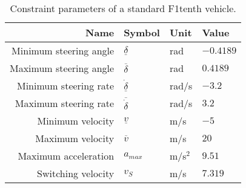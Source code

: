 \begin{table}[htb!]
\centering
\small
\begin{tabular}{rlll} 
    \hline
    \textbf{Name} & \textbf{Symbol} & \textbf{Unit} & \textbf{Value}\\ 
    \hline
    Minimum steering angle & $\underline{\delta}$ & rad & $-0.4189$ \\
    Maximum steering angle & $\overline{\delta}$ & rad & $0.4189$ \\
    Minimum steering rate & $\underline{\dot{\delta}}$ & rad/s & $-3.2$ \\
    Maximum steering rate & $\overline{\dot{\delta}}$ & rad/s & $3.2$ \\
    Minimum velocity & $\underline{v}$ & m/s & $-5$ \\
    Maximum velocity & $\overline{v}$ & m/s & $20$\\
    Maximum acceleration & $a_{max}$ & m/s$^2$ & $9.51$ \\
    Switching velocity & $v_S$ & m/s & $7.319$\\
    \hline
\end{tabular}
\caption[Vehicle constraint parameters]{Constraint parameters of a standard F1tenth vehicle.}
\label{tab:constraint_parameters}
\end{table}



